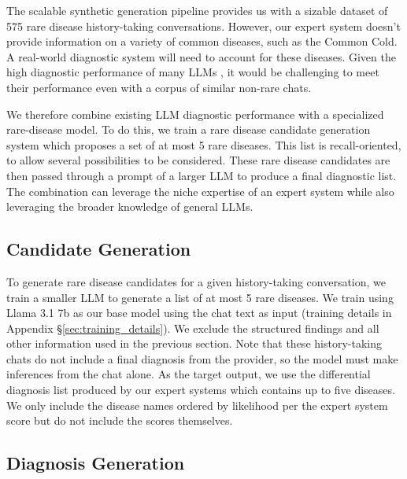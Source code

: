 The \methodname scalable synthetic generation pipeline provides us with a sizable dataset of 575 rare disease history-taking conversations.  However, our expert system doesn't provide information on a variety of common diseases, such as the Common Cold.  A real-world diagnostic system will need to account for these diseases.  Given the high diagnostic performance of many LLMs \cite{generalistMedicalLangaugeModel, Rutledge2024DiagnosticAO,zhou2024largelanguagemodelsdisease,tu2024conversationaldiagnosticai}, it would be challenging to meet their performance even with a corpus of similar non-rare chats.

We therefore combine existing LLM diagnostic performance with a specialized rare-disease model.  To do this, we train a rare disease candidate generation system which proposes a set of at most 5 rare diseases.  This list is recall-oriented, to allow several possibilities to be considered.  These rare disease candidates are then passed through a prompt of a larger LLM to produce a final diagnostic list.  The combination can leverage the niche expertise of an expert system while also leveraging the broader knowledge of general LLMs.

\subsection{Candidate Generation} \label{sec:candidate_gen_training}
To generate rare disease candidates for a given history-taking conversation, we train a smaller LLM to generate a list of at most 5 rare diseases. We train using Llama 3.1 7b as our base model \cite{grattafiori2024llama3herdmodels} using the chat text as input (training details in  Appendix \S \ref{sec:training_details}).   We exclude the structured findings and all other information used in the previous section. Note that these history-taking chats do not include a final diagnosis from the provider, so the model must make inferences from the chat alone. As the target output, we use the differential diagnosis list produced by our expert systems which contains up to five diseases.  We only include the disease names ordered by likelihood per the expert system score but do not include the scores themselves.



\subsection{Diagnosis Generation}\label{sec:ddx_gen}

